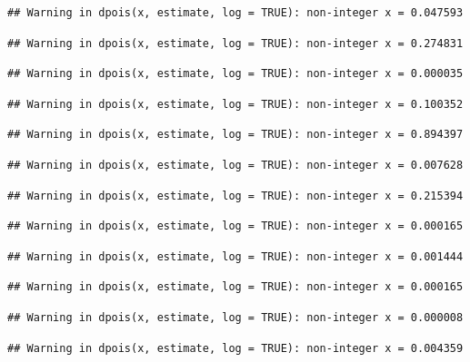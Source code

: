 \documentclass[]{article}
\begin{document}
\begin{verbatim}
## Warning in dpois(x, estimate, log = TRUE): non-integer x = 0.047593
\end{verbatim}

\begin{verbatim}
## Warning in dpois(x, estimate, log = TRUE): non-integer x = 0.274831
\end{verbatim}

\begin{verbatim}
## Warning in dpois(x, estimate, log = TRUE): non-integer x = 0.000035
\end{verbatim}

\begin{verbatim}
## Warning in dpois(x, estimate, log = TRUE): non-integer x = 0.100352
\end{verbatim}

\begin{verbatim}
## Warning in dpois(x, estimate, log = TRUE): non-integer x = 0.894397
\end{verbatim}

\begin{verbatim}
## Warning in dpois(x, estimate, log = TRUE): non-integer x = 0.007628
\end{verbatim}

\begin{verbatim}
## Warning in dpois(x, estimate, log = TRUE): non-integer x = 0.215394
\end{verbatim}

\begin{verbatim}
## Warning in dpois(x, estimate, log = TRUE): non-integer x = 0.000165
\end{verbatim}

\begin{verbatim}
## Warning in dpois(x, estimate, log = TRUE): non-integer x = 0.001444
\end{verbatim}

\begin{verbatim}
## Warning in dpois(x, estimate, log = TRUE): non-integer x = 0.000165
\end{verbatim}

\begin{verbatim}
## Warning in dpois(x, estimate, log = TRUE): non-integer x = 0.000008
\end{verbatim}

\begin{verbatim}
## Warning in dpois(x, estimate, log = TRUE): non-integer x = 0.004359
\end{verbatim}
\end{document}
